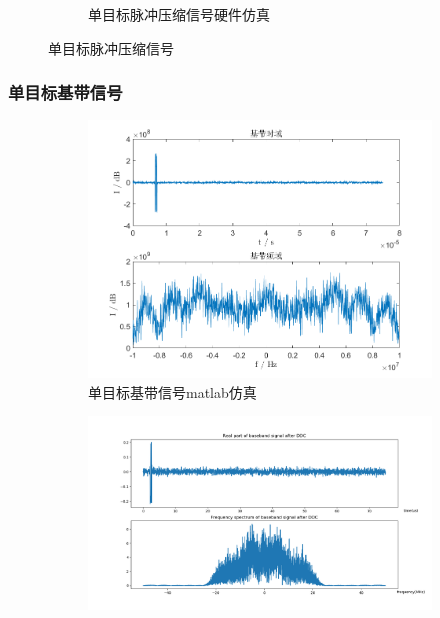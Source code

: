 \documentclass{article}
\newcounter{sub}
\begin{document}
\begin{figure}[H]
\begin{subfigure}[H]{.45\linewidth}
		\caption{单目标脉冲压缩信号硬件仿真}
		\label{fig:单目标脉冲压缩信号硬件仿真}
	\end{subfigure}
	\caption{单目标脉冲压缩信号}
	\label{fig:单目标脉冲压缩信号}
\end{figure}

\subsubsection{单目标基带信号}%
\label{ssub:单目标基带信号}

\begin{figure}[H]
	\centering
	\begin{subfigure}[H]{.45\linewidth}
		\centering
		\includegraphics[width=\linewidth]{one-baseband-matlab.png}
		\caption{单目标基带信号matlab仿真}
		\label{fig:单目标基带信号matlab仿真}
	\end{subfigure}
	\quad
	\begin{subfigure}[H]{.45\linewidth}
		\centering
		\includegraphics[width=\linewidth]{one-baseband-software.png}

\end{subfigure}
\end{figure}
\end{document}
